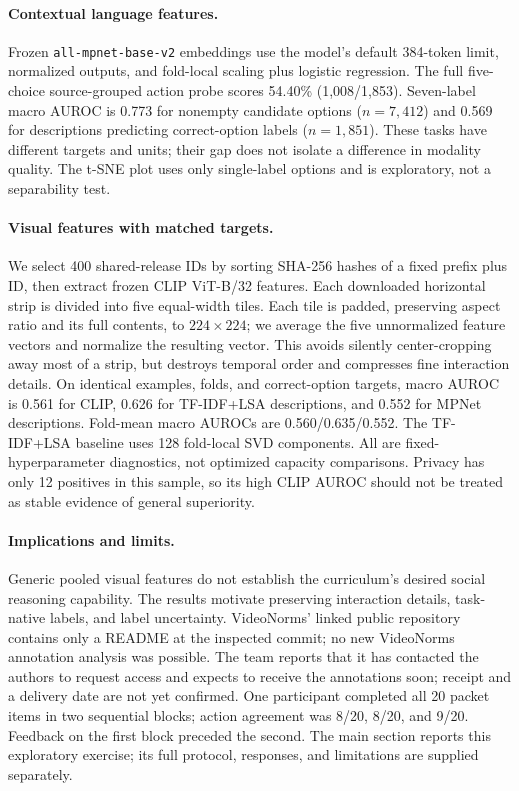 \paragraph{Contextual language features.} Frozen \texttt{all-mpnet-base-v2} embeddings use the model's default 384-token limit, normalized outputs, and fold-local scaling plus logistic regression. The full five-choice source-grouped action probe scores 54.40\% (1,008/1,853). Seven-label macro AUROC is 0.773 for nonempty candidate options ($n=7{,}412$) and 0.569 for descriptions predicting correct-option labels ($n=1{,}851$). These tasks have different targets and units; their gap does not isolate a difference in modality quality. The t-SNE plot uses only single-label options and is exploratory, not a separability test.

\paragraph{Visual features with matched targets.} We select 400 shared-release IDs by sorting SHA-256 hashes of a fixed prefix plus ID, then extract frozen CLIP ViT-B/32 features. Each downloaded horizontal strip is divided into five equal-width tiles. Each tile is padded, preserving aspect ratio and its full contents, to $224\times224$; we average the five unnormalized feature vectors and normalize the resulting vector. This avoids silently center-cropping away most of a strip, but destroys temporal order and compresses fine interaction details. On identical examples, folds, and correct-option targets, macro AUROC is 0.561 for CLIP, 0.626 for TF-IDF+LSA descriptions, and 0.552 for MPNet descriptions. Fold-mean macro AUROCs are 0.560/0.635/0.552. The TF-IDF+LSA baseline uses 128 fold-local SVD components. All are fixed-hyperparameter diagnostics, not optimized capacity comparisons. Privacy has only 12 positives in this sample, so its high CLIP AUROC should not be treated as stable evidence of general superiority.

\paragraph{Implications and limits.} Generic pooled visual features do not establish the curriculum's desired social reasoning capability. The results motivate preserving interaction details, task-native labels, and label uncertainty. VideoNorms' linked public repository contains only a README at the inspected commit; no new VideoNorms annotation analysis was possible. The team reports that it has contacted the authors to request access and expects to receive the annotations soon; receipt and a delivery date are not yet confirmed. One participant completed all 20 packet items in two sequential blocks; action agreement was 8/20, 8/20, and 9/20. Feedback on the first block preceded the second. The main section reports this exploratory exercise; its full protocol, responses, and limitations are supplied separately.

